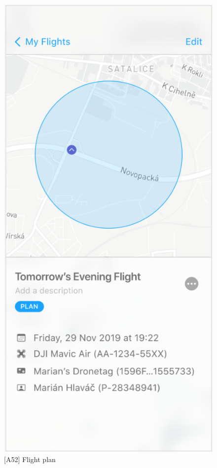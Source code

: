 \begin{figure}
\begin{minipage}{.45\textwidth}
        \includegraphics[width=.7\linewidth]{assets/user_interface_design/flight/flight_plan.png}
        \caption{[A52] Flight plan}
        \label{fig:flight_plan}
    \end{minipage}
    \label{fig:plan_a_flight_all_2}
\end{figure}


